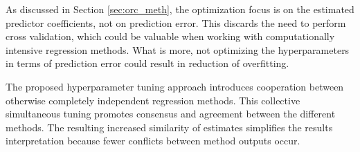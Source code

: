 As discussed in Section \ref{sec:orc_meth}, the optimization focus is on the estimated predictor coefficients, not on prediction error. This discards the need to perform cross validation, which could be valuable when working with computationally intensive regression methods. What is more, not optimizing the hyperparameters in terms of prediction error could result in reduction of overfitting.

The proposed hyperparameter tuning approach introduces cooperation between otherwise completely independent regression methods. This collective simultaneous tuning promotes consensus and agreement between the different methods. The resulting increased similarity of estimates simplifies the results interpretation because fewer conflicts between method outputs occur. 
